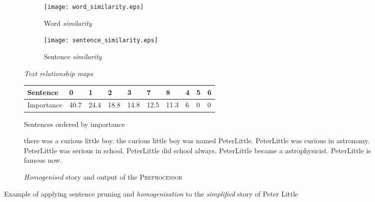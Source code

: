 \begin{figure}[H]
\begin{subfigure}{\textwidth}
\begin{subfigure}{0.5\textwidth}
\renewcommand\thesubfigure{\roman{subfigure}}
\texttt{[image: word\_similarity.eps]}
\caption{Word \textit{similarity}}
\end{subfigure}
\begin{subfigure}{0.5\textwidth}
\renewcommand\thesubfigure{\roman{subfigure}}
\texttt{[image: sentence\_similarity.eps]}
\caption{Sentence \textit{similarity}}
\end{subfigure}
\setcounter{subfigure}{0}
\caption{\textit{Text relationship maps}}
\label{fig:trm_peter_little}
\end{subfigure}
\begin{subfigure}{\textwidth}
\vspace{\baselineskip}
\centering
\begin{tabular}{@{}llllllllll@{}}
\toprule
Sentence   & 0    & 1    & 2    & 3    & 7    & 8    & 4 & 5 & 6 \\ \midrule
Importance & 40.7 & 24.4 & 18.8 & 14.8 & 12.5 & 11.3 & 6 & 0 & 0 \\ \bottomrule
\end{tabular}
\caption{Sentences ordered by importance}
\end{subfigure}
\begin{subfigure}{\textwidth}
\vspace{\baselineskip}
\begin{displayquote}
there was a curious little boy. the curious little boy was named PeterLittle. PeterLittle was curious in astronomy. PeterLittle was serious in school. PeterLittle did school always. PeterLittle became a astrophysicist. PeterLittle is famous now.
\end{displayquote}
\caption{\textit{Homogenised} story and output of the \textsc{Preprocessor}}
\end{subfigure}
\caption{Example of applying sentence pruning and \textit{homogenisation} to the \textit{simplified} story of Peter Little}
\label{fig:pruning_homogenisation_example}
\end{figure}